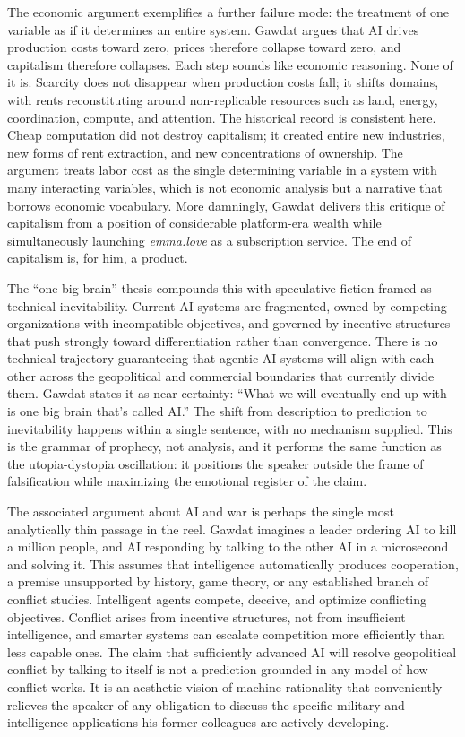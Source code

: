 \documentclass[12pt, a4paper]{article}
\begin{document}
The economic argument exemplifies a further failure mode: the treatment of one variable as if it
determines an entire system. Gawdat argues that AI drives production costs toward zero, prices
therefore collapse toward zero, and capitalism therefore collapses. Each step sounds like economic
reasoning. None of it is. Scarcity does not disappear when production costs fall; it shifts domains,
with rents reconstituting around non-replicable resources such as land, energy, coordination,
compute, and attention. The historical record is consistent here. Cheap computation did not destroy
capitalism; it created entire new industries, new forms of rent extraction, and new concentrations
of ownership. The argument treats labor cost as the single determining variable in a system with
many interacting variables, which is not economic analysis but a narrative that borrows economic
vocabulary. More damningly, Gawdat delivers this critique of capitalism from a position of
considerable platform-era wealth while simultaneously launching \textit{emma.love} as a
subscription service. The end of capitalism is, for him, a product.

The ``one big brain'' thesis compounds this with speculative fiction framed as technical
inevitability. Current AI systems are fragmented, owned by competing organizations with
incompatible objectives, and governed by incentive structures that push strongly toward
differentiation rather than convergence. There is no technical trajectory guaranteeing that agentic
AI systems will align with each other across the geopolitical and commercial boundaries that
currently divide them. Gawdat states it as near-certainty: ``What we will eventually end up with
is one big brain that's called AI.'' The shift from description to prediction to inevitability
happens within a single sentence, with no mechanism supplied. This is the grammar of prophecy, not
analysis, and it performs the same function as the utopia-dystopia oscillation: it positions the
speaker outside the frame of falsification while maximizing the emotional register of the claim.

The associated argument about AI and war is perhaps the single most analytically thin passage in
the reel. Gawdat imagines a leader ordering AI to kill a million people, and AI responding by
talking to the other AI in a microsecond and solving it. This assumes that intelligence
automatically produces cooperation, a premise unsupported by history, game theory, or any
established branch of conflict studies. Intelligent agents compete, deceive, and optimize
conflicting objectives. Conflict arises from incentive structures, not from insufficient
intelligence, and smarter systems can escalate competition more efficiently than less capable ones.
The claim that sufficiently advanced AI will resolve geopolitical conflict by talking to itself is
not a prediction grounded in any model of how conflict works. It is an aesthetic vision of machine
rationality that conveniently relieves the speaker of any obligation to discuss the specific
military and intelligence applications his former colleagues are actively developing.
\end{document}
